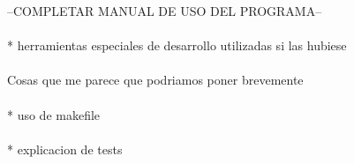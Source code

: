 --COMPLETAR MANUAL DE USO DEL PROGRAMA--
\\
\\
* herramientas especiales de desarrollo utilizadas si las hubiese
\\
\\
Cosas que me parece que podriamos poner brevemente
\\
\\
* uso de makefile
\\
\\
* explicacion de tests